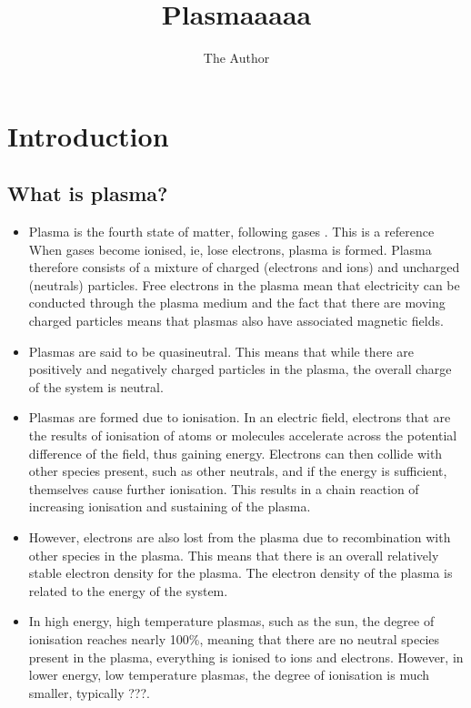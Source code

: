 \documentclass[11pt, oneside]{article}   	%
\title{Plasmaaaaa}
\author{The Author}
\begin{document}
\maketitle
\section{Introduction}

\subsection{What is plasma?}

\begin{itemize}
\item Plasma is the fourth state of matter, following gases \cite{Graves2012}. This is a reference \cite{Attri2015} When gases become ionised, ie, lose electrons, plasma is formed. Plasma therefore consists of a mixture of charged (electrons and ions) and uncharged (neutrals) particles. Free electrons in the plasma mean that electricity can be conducted through the plasma medium and the fact that there are moving charged particles means that plasmas also have associated magnetic fields.
\item Plasmas are said to be quasineutral. This means that while there are positively and negatively charged particles in the plasma, the overall charge of the system is neutral.
\item Plasmas are formed due to ionisation. In an electric field, electrons that are the results of ionisation of atoms or molecules accelerate across the potential difference of the field, thus gaining energy.
Electrons can then collide with other species present, such as other neutrals, and if the energy is sufficient, themselves cause further ionisation.
This results in a chain reaction of increasing ionisation and sustaining of the plasma.
\item However, electrons are also lost from the plasma due to recombination with other species in the plasma.
This means that there is an overall relatively stable electron density for the plasma. 
The electron density of the plasma is related to the energy of the system.
\item In high energy, high temperature plasmas, such as the sun, the degree of ionisation reaches nearly 100\%, meaning that there are no neutral species present in the plasma, everything is ionised to ions and electrons. 
However, in lower energy, low temperature plasmas, the degree of ionisation is much smaller, typically ???.

\end{itemize}
\end{document}
